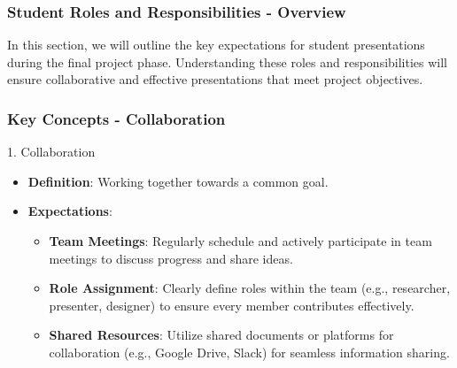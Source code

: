 \documentclass[aspectratio=169]{beamer}
\begin{document}
\begin{frame}[fragile]
    \frametitle{Student Roles and Responsibilities - Overview}
    In this section, we will outline the key expectations for student presentations during the final project phase. Understanding these roles and responsibilities will ensure collaborative and effective presentations that meet project objectives.
\end{frame}

\begin{frame}[fragile]
    \frametitle{Key Concepts - Collaboration}
    \begin{block}{1. Collaboration}
        \begin{itemize}
            \item \textbf{Definition}: Working together towards a common goal.
            \item \textbf{Expectations}:
                \begin{itemize}
                    \item \textbf{Team Meetings}: Regularly schedule and actively participate in team meetings to discuss progress and share ideas.
                    \item \textbf{Role Assignment}: Clearly define roles within the team (e.g., researcher, presenter, designer) to ensure every member contributes effectively.
                    \item \textbf{Shared Resources}: Utilize shared documents or platforms for collaboration (e.g., Google Drive, Slack) for seamless information sharing.
                \end{itemize}
        \end{itemize}
    \end{block}
\end{frame}
\end{document}
